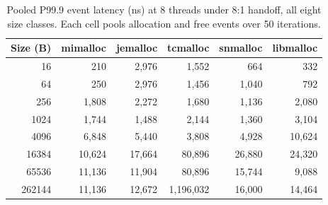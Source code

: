\begin{table}[!htbp]
\centering
\footnotesize
\setlength{\tabcolsep}{3pt}
\caption{Pooled P99.9 event latency (ns) at 8 threads under 8:1 handoff, all eight size classes. Each cell pools allocation and free events over 50 iterations.}
\label{tab:atlas-8to1}
\begin{tabular}{rrrrrr}
\toprule
Size (B) & mimalloc & jemalloc & tcmalloc & snmalloc & libmalloc \\
\midrule
16 & 210 & 2{,}976 & 1{,}552 & 664 & 332 \\
64 & 250 & 2{,}976 & 1{,}456 & 1{,}040 & 792 \\
256 & 1{,}808 & 2{,}272 & 1{,}680 & 1{,}136 & 2{,}080 \\
1024 & 1{,}744 & 1{,}488 & 2{,}144 & 1{,}360 & 3{,}104 \\
4096 & 6{,}848 & 5{,}440 & 3{,}808 & 4{,}928 & 10{,}624 \\
16384 & 10{,}624 & 17{,}664 & 80{,}896 & 26{,}880 & 24{,}320 \\
65536 & 11{,}136 & 11{,}904 & 80{,}896 & 15{,}744 & 9{,}088 \\
262144 & 11{,}136 & 12{,}672 & 1{,}196{,}032 & 16{,}000 & 14{,}464 \\
\bottomrule
\end{tabular}
\end{table}
